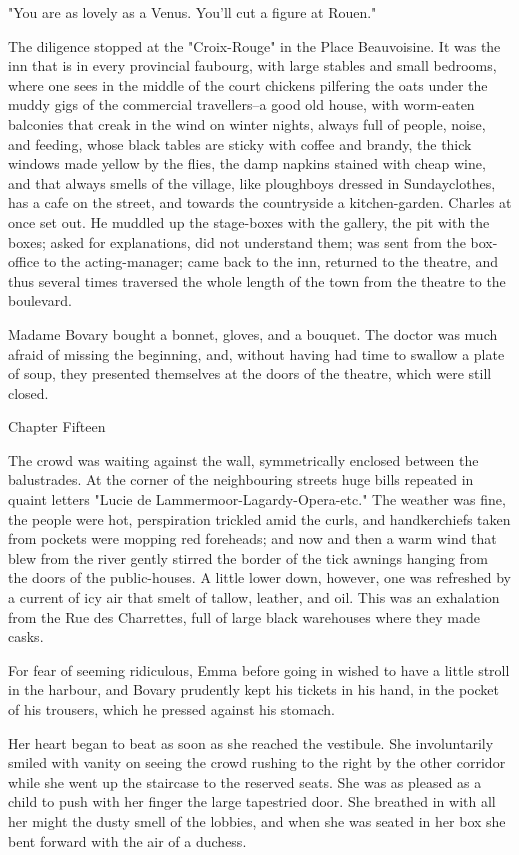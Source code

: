 \documentclass[11pt,twocolumn]{ltugboat}
\begin{document}
"You are as lovely as a Venus. You'll cut a figure at Rouen."

The diligence stopped at the "Croix-Rouge" in the Place Beauvoisine. It
was the inn that is in every provincial faubourg, with large stables
and small bedrooms, where one sees in the middle of the court chickens
pilfering the oats under the muddy gigs of the commercial travellers--a
good old house, with worm-eaten balconies that creak in the wind on
winter nights, always full of people, noise, and feeding, whose black
tables are sticky with coffee and brandy, the thick windows made yellow
by the flies, the damp napkins stained with cheap wine, and that always
smells of the village, like ploughboys dressed in Sundayclothes, has
a cafe on the street, and towards the countryside a kitchen-garden.
Charles at once set out. He muddled up the stage-boxes with the gallery,
the pit with the boxes; asked for explanations, did not understand them;
was sent from the box-office to the acting-manager; came back to the
inn, returned to the theatre, and thus several times traversed the whole
length of the town from the theatre to the boulevard.

Madame Bovary bought a bonnet, gloves, and a bouquet. The doctor was
much afraid of missing the beginning, and, without having had time to
swallow a plate of soup, they presented themselves at the doors of the
theatre, which were still closed.




Chapter Fifteen

The crowd was waiting against the wall, symmetrically enclosed between
the balustrades. At the corner of the neighbouring streets huge bills
repeated in quaint letters "Lucie de Lammermoor-Lagardy-Opera-etc." The
weather was fine, the people were hot, perspiration trickled amid the
curls, and handkerchiefs taken from pockets were mopping red foreheads;
and now and then a warm wind that blew from the river gently stirred the
border of the tick awnings hanging from the doors of the public-houses.
A little lower down, however, one was refreshed by a current of icy air
that smelt of tallow, leather, and oil. This was an exhalation from
the Rue des Charrettes, full of large black warehouses where they made
casks.

For fear of seeming ridiculous, Emma before going in wished to have a
little stroll in the harbour, and Bovary prudently kept his tickets in
his hand, in the pocket of his trousers, which he pressed against his
stomach.

Her heart began to beat as soon as she reached the vestibule. She
involuntarily smiled with vanity on seeing the crowd rushing to the
right by the other corridor while she went up the staircase to the
reserved seats. She was as pleased as a child to push with her finger
the large tapestried door. She breathed in with all her might the
dusty smell of the lobbies, and when she was seated in her box she bent
forward with the air of a duchess.
\end{document}
